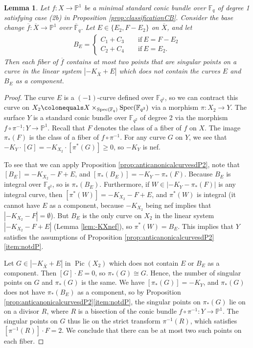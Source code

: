 \documentclass[a4paper, 11pt, reqno]{amsart}
\numberwithin{equation}{section} \numberwithin{figure}{section}
\DeclareMathOperator{\Pic}{Pic}
\DeclareMathOperator{\Spec}{Spec}
\def \F {{\mathbb F}}
\def \P {{\mathbb P}}
\newcommand{\ra}{\rightarrow}
\newtheorem{lemma}{Lemma}
\theoremstyle{definition}
\numberwithin{lemma}{section}
\begin{document}
\begin{lemma}\label{lem:(2b)singpoints-KX+E}
    Let $f \colon X \ra \P^1$ be a minimal standard conic bundle over $\F_q$ of degree 1 satisfying case (2b) in Proposition \ref{prop:classificationCB}. Consider the base change $\overline{f} \colon \overline{X} \ra \P^1$ over $\overline{\F}_q$. Let $E \in \{E_2, F - E_2\}$ on $\overline{X}$, and let 
    \begin{align*}
        B_E = \begin{cases}
            C_1 + C_3 \qquad \text{if} \ E = F - E_2\\
            C_2 + C_4 \qquad \text{if} \ E = E_2.
        \end{cases} 
    \end{align*}
    Then each fiber of $\overline{f}$ contains at most two points that are singular points on a curve in the linear system $|-K_{\overline{X}} + E|$ which does not contain the curves $E$ and $B_E$ as a component.
\end{lemma}

\begin{proof}
    The curve $E$ is a $(-1)$-curve defined over $\F_{q^2}$, so we can contract this curve on $X_{2} \colonequals X \times_{\Spec(\F_q)} \Spec(\F_{q^2})$ via a morphism $\pi \colon X_{2} \ra Y$. The surface $Y$ is a standard conic bundle over $\F_{q^2}$ of degree 2 via the morphism $f \circ \pi^{-1} \colon Y \ra \P^1$. Recall that $F$ denotes the class of a fiber of $f$ on $X$. The image $\pi_*(F)$ is the class of a fiber of $f \circ \pi^{-1}$. For any curve $G$ on $Y$, we see that $-K_Y \cdot [G] = -K_{X_2} \cdot [\pi^*(G)] \geq 0$, so $-K_Y$ is nef.
    
    To see that we can apply Proposition \ref{prop:anticanonicalcurvesdP2}, note that $[B_E] = -K_{X_2} - F + E$, and $[\pi_*(B_E)] = -K_{Y} - \pi_*(F)$. Because $B_E$ is integral over $\F_{q^2}$, so is $\pi_*(B_E)$. Furthermore, if $W \in |-K_Y - \pi_*(F)|$ is any integral curve, then $[\pi^*(W)] = -K_{X_2} - F + E$, and $\pi^*(W)$ is integral (it cannot have $E$ as a component, because $-K_{X_2}$ being nef implies that $|-K_{X_2} - F| =\emptyset$). But $B_E$ is the only curve on $X_2$ in the linear system $|-K_{X_2} - F + E|$ (Lemma \ref{lem:-KXnef}), so $\pi^*(W) = B_E$. This implies that $Y$ satisfies the assumptions of Proposition \ref{prop:anticanonicalcurvesdP2}\ref{item:notdP}. 
    
    Let $G \in |-K_{\overline{X}} + E|$ in $\Pic(X_2)$ which does not contain $E$ or $B_E$ as a component. Then $[G] \cdot E = 0$, so $\pi_*(G) \cong G$. Hence, the number of singular points on $G$ and $\pi_*(G)$ is the same. We have $[\pi_*(G)] = -K_Y$, and $\pi_*(G)$ does not have $\pi_*(B_E)$ as a component, so by Proposition \ref{prop:anticanonicalcurvesdP2}\ref{item:notdP}, the singular points on $\pi_*(G)$ lie on on a divisor $R$, where $R$ is a bisection of the conic bundle $f \circ \pi^{-1} \colon Y \ra \P^1$. The singular points on $G$ thus lie on the strict transform $\pi^{-1}(R)$, which satisfies $[\pi^{-1}(R)] \cdot F = 2$. We conclude that there can be at most two such points on each fiber.
\end{proof}
\end{document}

